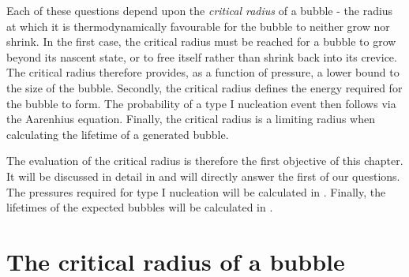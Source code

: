 Each of these questions depend upon the  {\em critical radius} of a bubble - the radius at which it is thermodynamically favourable for the bubble to neither grow  nor shrink.
In the first case, the critical radius must be reached for a bubble to grow beyond its nascent state, 
or to free itself rather than shrink back into its crevice.  
The critical radius therefore provides, as a function of pressure,  a lower bound to the size of the bubble.
Secondly, the critical radius defines the energy required for the bubble to form.
The probability of a type I nucleation event then follows via the Aarenhius equation.
Finally, the critical radius is a limiting radius when calculating the lifetime of a generated bubble. %



The evaluation of the critical radius is therefore the first objective of this chapter.
It will be discussed in detail in  and will directly answer the first of our questions.
The pressures required for type I nucleation will be calculated in .
Finally, the lifetimes of the expected bubbles will be calculated in .

\section{The critical radius of a bubble} \label{sec:nuc:radius}

